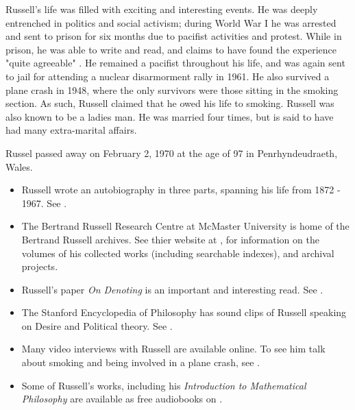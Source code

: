 \documentclass[../../../include/open-logic-section]{subfiles}
\begin{document}
Russell's life was filled with exciting and interesting events. He was
deeply entrenched in politics and social activism; during World War I he
was arrested and sent to prison for six months due to pacifist activities
and protest. While in prison, he was able to write and read, and claims to
have found the experience "quite agreeable" \citet[29]{Russell1968}. He
remained a pacifist throughout his life, and was again sent to jail for
attending a nuclear disarmorment rally in 1961. He also survived a plane
crash in 1948, where the only survivors were those sitting in the smoking
section. As such, Russell claimed that he owed his life to smoking. Russell
was also known to be a ladies man. He was married four times, but is
said to have had many extra-marital affairs.

Russel passed away on February 2, 1970 at the age of 97 in
Penrhyndeudraeth, Wales.

\begin{reading}

\begin{itemize}

\item Russell wrote an autobiography in three parts, spanning his life from
1872 - 1967. See \citet{Russell1967,Russell1968,Russell1969}.

\item The Bertrand Russell Research Centre at McMaster University is home
of the Bertrand Russell archives. See thier website at \citet{Duncan2015},
for information on the volumes of his
collected works (including searchable indexes), and archival projects.

\item Russell's paper \emph{On Denoting} is an important and interesting
read. See \citet{Russell1905}.

\item The Stanford Encyclopedia of Philosophy has sound clips of Russell
speaking on Desire and Political theory. See \citet{Irvine2015}.

\item Many video interviews with Russell are available online. To see him
talk about smoking and being involved in a plane crash, see
\citet{RussellND}.

\item Some of Russell's works, including his \emph{Introduction to
Mathematical Philosophy} are available as free audiobooks on
\citet{LibriVoxND}.

\end{itemize}

\end{reading}
\end{document}
